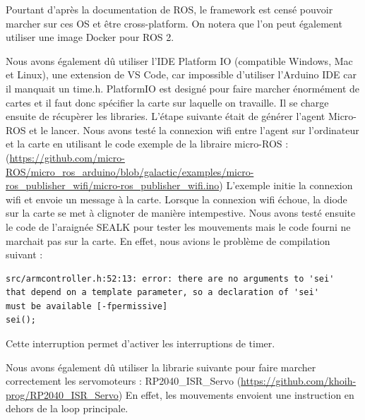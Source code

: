 Pourtant d'après la documentation de ROS, le framework est censé pouvoir marcher sur ces OS et être cross-platform.
On notera que l'on peut également utiliser une image Docker pour ROS 2. 
\linebreak

Nous avons également dû utiliser l’IDE Platform IO (compatible Windows, Mac et Linux), une extension de VS Code, 
car impossible d'utiliser l'Arduino IDE car il manquait un time.h.
PlatformIO est designé pour faire marcher énormément de cartes et il faut donc spécifier la carte sur laquelle on travaille. 
Il se charge ensuite de récupèrer les libraries.
L’étape suivante était de générer l’agent Micro-ROS et le lancer.  
Nous avons testé la connexion wifi entre l’agent sur l’ordinateur et la carte en utilisant le code exemple de la libraire micro-ROS : 
(\url{https://github.com/micro-ROS/micro_ros_arduino/blob/galactic/examples/micro-ros_publisher_wifi/micro-ros_publisher_wifi.ino}) 
L’exemple initie la connexion wifi et envoie un message à la carte. Lorsque la connexion wifi échoue, la diode sur la carte se 
met à clignoter de manière intempestive. Nous avons testé ensuite le code de l’araignée SEALK pour tester les mouvements mais le code 
fourni ne marchait pas sur la carte. En effet, nous avions le problème de compilation suivant :  

\begin{lstlisting}
src/armcontroller.h:52:13: error: there are no arguments to 'sei' 
that depend on a template parameter, so a declaration of 'sei' 
must be available [-fpermissive]
sei();
\end{lstlisting}
Cette interruption permet d'activer les interruptions de timer.
\linebreak

Nous avons également dû utiliser la librarie suivante pour faire marcher correctement les servomoteurs : RP2040\_ISR\_Servo (\url{https://github.com/khoih-prog/RP2040_ISR_Servo}) 
En effet, les mouvements envoient une instruction en dehors de la loop principale.


